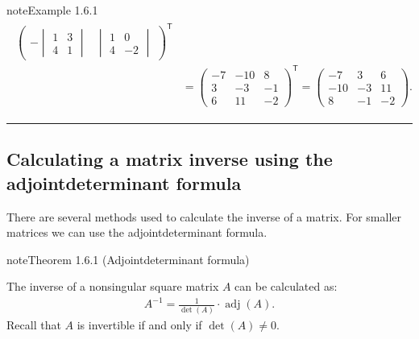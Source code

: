 \documentclass[letterpaper,10pt,english]{jupyterBook}
\begin{document}
\begin{sphinxadmonition}{note}{Example 1.6.1}
\begin{equation*}
\begin{split}
\begin{align*}
\begin{pmatrix}
        -\begin{vmatrix} 1 & 3 \\ 4 & 1 \end{vmatrix} &
        \begin{vmatrix} 1 & 0 \\ 4 & -2 \end{vmatrix}
    \end{pmatrix}^\mathsf{T} \\
    &= \begin{pmatrix} -7 & -10 & 8 \\ 3 & -3 & -1 \\ 6 & 11 & -2 \end{pmatrix}^\mathsf{T}
    = \begin{pmatrix} -7 & 3 & 6 \\ -10 & -3 & 11 \\ 8 & -1 & -2 \end{pmatrix}.
\end{align*} \end{split}
\end{equation*}\end{sphinxadmonition}


\bigskip\hrule\bigskip


\ignorespaces 

\subsection{Calculating a matrix inverse using the adjoint\sphinxhyphen{}determinant formula}
\label{\detokenize{_pages/1.5_Inverse_matrix:calculating-a-matrix-inverse-using-the-adjoint-determinant-formula}}\label{\detokenize{_pages/1.5_Inverse_matrix:index-2}}
\sphinxAtStartPar
There are several methods used to calculate the inverse of a matrix. For smaller matrices we can use the adjoint\sphinxhyphen{}determinant formula.
\label{_pages/1.5_Inverse_matrix:adjoint-determinant-formula-theorem}
\begin{sphinxadmonition}{note}{Theorem 1.6.1 (Adjoint\sphinxhyphen{}determinant formula)}



\sphinxAtStartPar
The inverse of a non\sphinxhyphen{}singular square matrix \(A\) can be calculated as:
\begin{equation}\label{equation:_pages/1.5_Inverse_matrix:adjoint-determinant-formula-equation}
\begin{split} A^{-1} = \frac{1}{\det(A)} \cdot \operatorname{adj}(A). \end{split}
\end{equation}
\sphinxAtStartPar
Recall that \(A\) is invertible if and only if \(\det(A)\neq 0\).
\end{sphinxadmonition}
\end{document}
